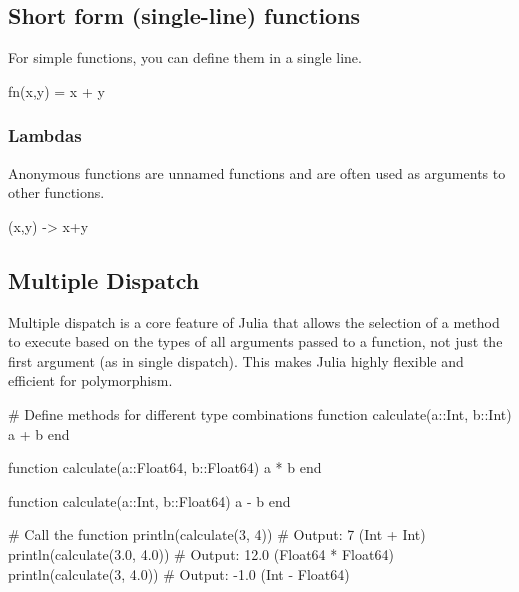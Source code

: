 \documentclass{report}
\begin{document}
    \subsection{Short form (single-line) functions}
    \bigbreak \noindent 
    For simple functions, you can define them in a single line.
    \bigbreak \noindent 
    \begin{jlcode}
    fn(x,y) = x + y 
    \end{jlcode}
    \bigbreak \noindent 
    \subsubsection{Lambdas}
    \bigbreak \noindent 
    Anonymous functions are unnamed functions and are often used as arguments to other functions.
    \bigbreak \noindent 
    \begin{jlcode}
        (x,y) -> x+y
    \end{jlcode}

    \bigbreak \noindent 
    \subsection{Multiple Dispatch}
    \bigbreak \noindent 
    Multiple dispatch is a core feature of Julia that allows the selection of a method to execute based on the types of all arguments passed to a function, not just the first argument (as in single dispatch). This makes Julia highly flexible and efficient for polymorphism.
    \bigbreak \noindent 
    \begin{jlcode}
    # Define methods for different type combinations
    function calculate(a::Int, b::Int)
        a + b
    end

    function calculate(a::Float64, b::Float64)
        a * b
    end

    function calculate(a::Int, b::Float64)
        a - b
    end

    # Call the function
    println(calculate(3, 4))       # Output: 7 (Int + Int)
    println(calculate(3.0, 4.0))   # Output: 12.0 (Float64 * Float64)
    println(calculate(3, 4.0))     # Output: -1.0 (Int - Float64)
    \end{jlcode}

    \pagebreak 
    \bigbreak \noindent 
\end{document}
